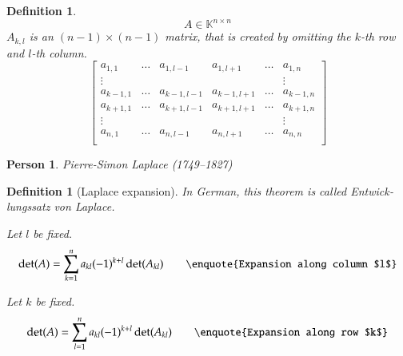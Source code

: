 \documentclass{article}
\newcounter{lecref}[section]
\numberwithin{lecref}{section}
\newtheorem{definition}[lecref]{Definition}
\newtheorem*{person}{Person}
\begin{document}
\begin{definition}
  \[ A \in \mathbb K^{n\times n} \]
  $A_{k,l}$ is an $(n-1) \times (n-1)$ matrix, that is created by omitting the $k$-th row and $l$-th column.
  \[
    \begin{bmatrix}
      a_{1,1} & \ldots & a_{1,l-1} & a_{1,l+1} & \ldots & a_{1,n} \\
      \vdots  &        &           &           &        & \vdots \\
      a_{k-1,1} & \ldots & a_{k-1,l-1} & a_{k-1,l+1} & \ldots & a_{k-1,n} \\
      a_{k+1,1} & \ldots & a_{k+1,l-1} & a_{k+1,l+1} & \ldots & a_{k+1,n} \\
      \vdots  &        &           &           &        & \vdots \\
      a_{n,1} & \ldots & a_{n,l-1} & a_{n,l+1} & \ldots & a_{n,n} \\
    \end{bmatrix}
  \]
\end{definition}

\begin{person}
  Pierre-Simon Laplace (1749--1827)
\end{person}
\begin{definition}[Laplace expansion] %
  In German, this theorem is called \foreignlanguage{german}{Entwicklungssatz von Laplace}.
  
  Let $l$ be fixed.
  \[ \det(A) = \sum_{k=1}^n a_{kl} (-1)^{k+l} \det(A_{kl}) \qquad \text{\enquote{Expansion along column $l$}} \]

  Let $k$ be fixed.
  \[ \det(A) = \sum_{l=1}^n a_{kl} (-1)^{k+l} \det(A_{kl}) \qquad \text{\enquote{Expansion along row $k$}} \]
\end{definition}
\end{document}
